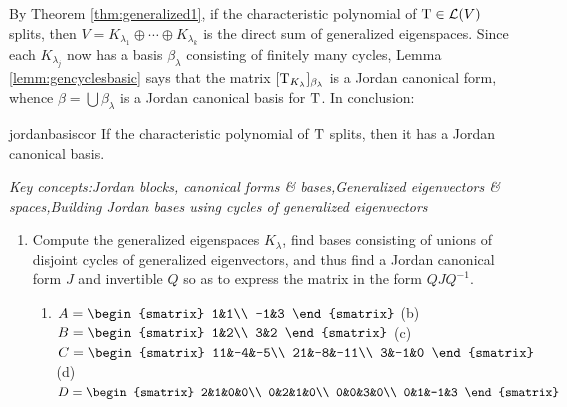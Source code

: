 By Theorem \ref{thm:generalized1}, if the characteristic polynomial of $\mathrm{T}\in\mathcal{L}(V)$ splits, then $V=K_{\lambda_1}\oplus\cdots\oplus K_{\lambda_k}$ is the direct sum of generalized eigenspaces. Since each $K_{\lambda_j}$ now has a basis $\beta_\lambda$ consisting of finitely many cycles, Lemma \ref{lemm:gencyclesbasic} says that the matrix $[\mathrm{T}_{K_\lambda}]_{\beta_\lambda}$ is a Jordan canonical form, whence $\beta=\bigcup\beta_\lambda$ is a Jordan canonical basis for $\mathrm{T}$. In conclusion:

\begin{cor}{}{jordanbasiscor}
	If the characteristic polynomial of $\mathrm{T}$ splits, then it has a Jordan canonical basis.
\end{cor}


\pagebreak[3]


\begin{exercises}
	\hangindent\leftmargini\emph{Key concepts:\quad Jordan blocks, canonical forms \& bases,\quad Generalized eigenvectors \& spaces,\quad Building Jordan bases using cycles of generalized eigenvectors}
	
	
	\begin{enumerate}
	  \item Compute the generalized eigenspaces $K_\lambda$, find bases consisting of unions of disjoint cycles of generalized eigenvectors, and thus find a Jordan canonical form $J$ and invertible $Q$ so as to express the matrix in the form $QJQ^{-1}$.
		\begin{enumerate}
	    \item $A=
	    \begin{smatrix}
	    	1&1\\
	    	-1&3
	    \end{smatrix}$
	    \qquad
	    (b)\ \ $B=\begin{smatrix}
	    	1&2\\
	    	3&2
	    \end{smatrix}$
			\qquad
	    (c)\ \ $C=\begin{smatrix}
	    	11&-4&-5\\
	    	21&-8&-11\\
	    	3&-1&0
	    \end{smatrix}$
	    \qquad
	    (d)\ \ $D=\begin{smatrix}
	    	2&1&0&0\\
	   		0&2&1&0\\
	    	0&0&3&0\\
	    	0&1&-1&3
	    \end{smatrix}$
		\end{enumerate}
		

\end{enumerate}
\end{exercises}
